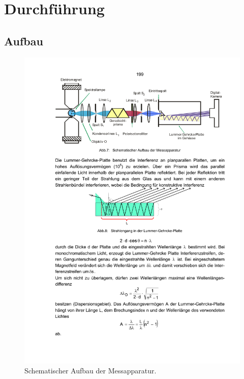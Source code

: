 \section{Durchführung}

\subsection{Aufbau}
\begin{figure}
    \centering
    \includegraphics[width=\textwidth]{graphics/messapparatur.pdf}
    \caption{Schematischer Aufbau der Messapparatur.\cite{anleitung}}
    \label{fig:messapparatur}
\end{figure}


